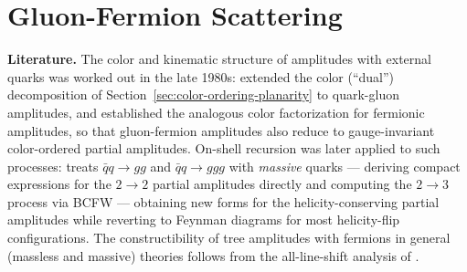\section{Gluon-Fermion Scattering}
\label{sec:gluon-fermion-scattering}

\textbf{Literature.} The color and kinematic structure of amplitudes with external quarks was worked out in the late 1980s: \autocite{Mangano:1987kp} extended the color (``dual'') decomposition of Section~\ref{sec:color-ordering-planarity} to quark-gluon amplitudes, and \autocite{Kosower:1988kh} established the analogous color factorization for fermionic amplitudes, so that gluon-fermion amplitudes also reduce to gauge-invariant color-ordered partial amplitudes. On-shell recursion was later applied to such processes: \autocite{Ozeren:2006ft} treats $\bar q q \to gg$ and $\bar q q \to ggg$ with \emph{massive} quarks --- deriving compact expressions for the $2 \to 2$ partial amplitudes directly and computing the $2 \to 3$ process via BCFW --- obtaining new forms for the helicity-conserving partial amplitudes while reverting to Feynman diagrams for most helicity-flip configurations. The constructibility of tree amplitudes with fermions in general (massless and massive) theories follows from the all-line-shift analysis of \autocite{Cohen:2010mi}. 